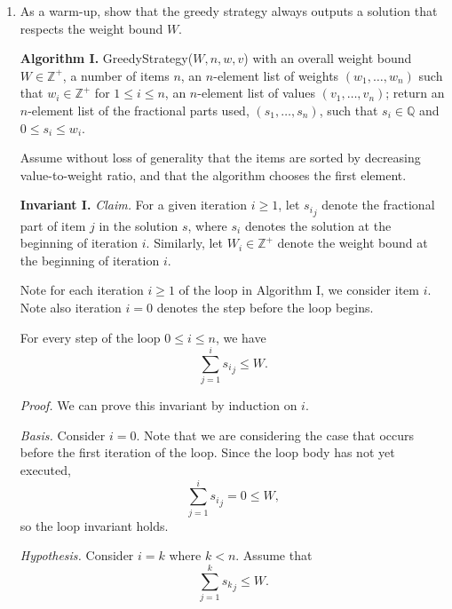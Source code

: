 \begin{enumerate}
    \item As a warm-up, show that the greedy strategy always outputs a solution that respects the weight bound $W$.
\begin{solution}

\textbf{Algorithm I. }{\sc GreedyStrategy($W,n,w,v$)} with an overall weight bound $W\in\mathbb{Z}^+$, a number of items $n$, an $n$-element list of weights $(w_1,\dots,w_n)$ such that $w_i\in\mathbb{Z}^+$ for $1\leq i\leq n$, an $n$-element list of values $(v_1,\dots,v_n)$; return an $n$-element list of the fractional parts used, $(s_1,\dots,s_n)$, such that $s_i\in\mathbb{Q}$ and $0\leq s_i\leq w_i$. 

Assume without loss of generality that the items are sorted by decreasing value-to-weight ratio, and that the algorithm chooses the first element.

\textbf{Invariant I. }\textit{Claim. }For a given iteration $i\geq 1$, let ${s_i}_j$ denote the fractional part of item $j$ in the solution $s$, where $s_i$ denotes the solution at the beginning of iteration $i$. Similarly, let $W_i\in\mathbb{Z}^+$ denote the weight bound at the beginning of iteration $i$.

Note for each iteration $i\geq 1$ of the loop in Algorithm I, we consider item $i$. Note also iteration $i=0$ denotes the step before the loop begins. 

For every step of the loop $0\leq i\leq n$, we have \[\sum_{j=1}^i{{s_i}_j}\leq W.\] 

\textit{Proof. }We can prove this invariant by induction on $i$.

\textit{Basis. }Consider $i=0$. Note that we are considering the case that occurs before the first iteration of the loop. Since the loop body has not yet executed, \[\sum_{j=1}^i{{s_i}_j}=0\leq W,\] so the loop invariant holds.

\textit{Hypothesis. }Consider $i=k$ where $k<n$. Assume that \[\sum_{j=1}^k{{s_k}_j}\leq W.\]


\end{solution}
\end{enumerate}
